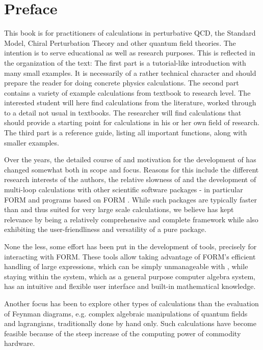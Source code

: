 \section*{Preface}

This book is for practitioners of calculations in perturbative QCD,
the Standard Model, Chiral Perturbation Theory and other quantum field theories.
The intention is to serve educational as well as research purposes.
This is reflected in the organization of the text:
The first part is a tutorial-like introduction with many small examples.
It is necessarily of a rather technical character and should prepare the
reader for doing concrete physics calculations.
The second part contains a variety of example calculations from textbook
to research level. The interested student will here find calculations
from the literature, worked through to a detail not usual in textbooks.
The researcher will find calculations that should provide a starting point
for calculations in his or her own field of research.
The third part is a reference guide, listing all important functions,
along with smaller examples.

Over the years, the detailed course of and motivation for the development of \fc has
changed somewhat both in scope and focus. Reasons for this include the
different research interests of the authors, the relative slowness of \mma and the development of
multi-loop calculations with other scientific software packages - in
particular FORM and programs based on FORM \cite{Vermaseren:2000nd,
Hahn:1998yk}. While such packages are typically faster than \fc and thus suited
for very large scale calculations, we believe \fc has kept relevance by being a
relatively comprehensive and complete framework while also exhibiting the
user-friendliness and versatility of a pure \mma package.

None the less, some effort has been put in the development of \fc tools,
precisely for interacting with FORM.
These tools allow taking advantage of FORM's efficient handling of large expressions, which can be simply
unmanageable with \mma, while staying within the \mma system, which as a
general purpose computer algebra system, has an intuitive and flexible
user interface and built-in mathematical knowledge.

Another focus has been to explore other types of calculations than the evaluation of Feynman
diagrams, e.g. complex algebraic manipulations of quantum fields and lagrangians, traditionally done by hand only.
Such calculations have become feasible because of the steep increase of the
computing power of commodity hardware.

